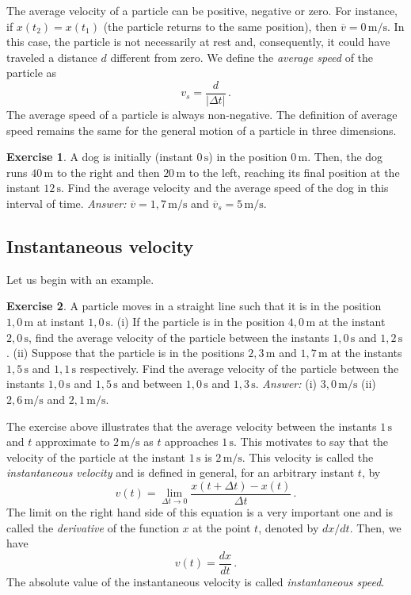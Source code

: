 \documentclass[12pt,a4paper]{article}
\theoremstyle{definition}
\newtheorem{ex}{Exercise}[section]
\begin{document}
The average velocity of a particle can be positive, negative or
zero. For instance, if $x(t_2)=x(t_1)$ (the particle returns to the
same position), then $\overline{v}=0\,\mathrm{m/s}$. In this case, the
particle is not necessarily at rest and, consequently, it could have
traveled a distance $d$ different from zero. We define the
\emph{average speed} of the particle as
$$v_s=\frac{d}{|\Delta t|}\,.$$
The average speed of a particle is always non-negative. The definition
of average speed remains the same for the general motion of a particle
in three dimensions.
\begin{ex}
  A dog is initially (instant $0\,\mathrm{s}$) in the position
  $0\,\mathrm{m}$. Then, the dog runs $40\,\mathrm{m}$ to the right
  and then $20\,\mathrm{m}$ to the left, reaching its final position
  at the instant $12\,\mathrm{s}$. Find the average velocity and the
  average speed of the dog in this interval of time. \emph{Answer:}
  $\overline{v}=1{,}7\,\mathrm{m/s}$ and
  $\overline{v}_s=5\,\mathrm{m/s}$.
\end{ex}

\subsection{Instantaneous velocity}

Let us begin with an example.

\begin{ex}
  A particle moves in a straight line such that it is in the position
  $1{,}0\,\mathrm{m}$ at instant $1{,}0\,\mathrm{s}$. (i) If the
  particle is in the position $4{,}0\,\mathrm{m}$ at the instant
  $2{,}0\,\mathrm{s}$, find the average velocity of the particle
  between the instants $1{,}0\,\mathrm{s}$ and
  $1{,}2\,\mathrm{s}$. (ii) Suppose that the particle is in the
  positions $2{,}3\,\mathrm{m}$ and $1{,}7\,\mathrm{m}$ at the
  instants $1{,}5\,\mathrm{s}$ and $1{,}1\,\mathrm{s}$
  respectively. Find the average velocity of the particle between the
  instants $1{,}0\,\mathrm{s}$ and $1{,}5\,\mathrm{s}$ and between
  $1{,}0\,\mathrm{s}$ and $1{,}3\,\mathrm{s}$. \emph{Answer:} (i)
  $3{,}0\,\mathrm{m/s}$ (ii) $2{,}6\,\mathrm{m/s}$ and
  $2{,}1\,\mathrm{m/s}$.
\end{ex}

The exercise above illustrates that the average velocity between the
instants $1\,\mathrm{s}$ and $t$ approximate to $2\,\mathrm{m/s}$ as
$t$ approaches $1\,\mathrm{s}$. This motivates to say that the
velocity of the particle at the instant $1\,\mathrm{s}$ is
$2\,\mathrm{m/s}$. This velocity is called the \emph{instantaneous
  velocity} and is defined in general, for an arbitrary instant $t$,
by
$$v(t)=\lim_{\Delta t\to 0}\frac{x(t+\Delta t)-x(t)}{\Delta t}\,.$$
The limit on the right hand side of this equation is a very important
one and is called the \emph{derivative} of the function $x$ at the
point $t$, denoted by $dx/dt$. Then, we have
$$v(t)=\frac{dx}{dt}\,.$$
The absolute value of the instantaneous velocity is called
\emph{instantaneous speed}.
\end{document}
